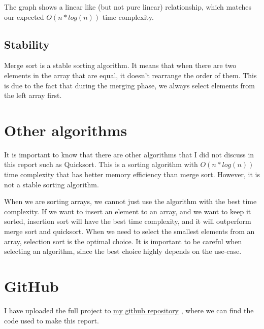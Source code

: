 \documentclass[a4paper,11pt]{article}
\newcommand{\underlinehref}[2]{%
    \href{#1}{\ul{#2}}%
}
\begin{document}
    The graph shows a linear like (but not pure linear) relationship, which matches our expected $O(n*log(n))$ time complexity.

    \subsection*{Stability}

    Merge sort is a stable sorting algorithm.
    It means that when there are two elements in the array that are equal, it doesn't rearrange the order of them.
    This is due to the fact that during the merging phase, we always select elements from the left array first.

    \section*{Other algorithms}

    It is important to know that there are other algorithms that I did not discuss in this report such as Quicksort.
    This is a sorting algorithm with $O(n*log(n))$ time complexity that has better memory efficiency than merge sort.
    However, it is not a stable sorting algorithm.

    When we are sorting arrays, we cannot just use the algorithm with the best time complexity.
    If we want to insert an element to an array, and we want to keep it sorted, insertion sort will have the best time complexity, and it will outperform merge sort and quicksort.
    When we need to select the smallest elements from an array, selection sort is the optimal choice.
    It is important to be careful when selecting an algorithm, since the best choice highly depends on the use-case.

    \section*{GitHub}
    I have uploaded the full project to \underlinehref{https://github.com/peterherczku/ID1021/tree/main/assignment-4}{my github repository}, where we can find the code used to make this report.
\end{document}
